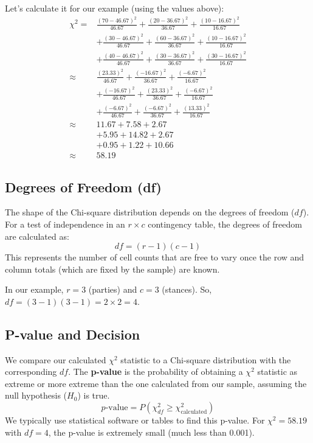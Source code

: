\documentclass{article}
\begin{document}
Let's calculate it for our example (using the values above):
\begin{align*} \chi^2 = & \frac{(70 - 46.67)^2}{46.67} + \frac{(20 - 36.67)^2}{36.67} + \frac{(10 - 16.67)^2}{16.67} \\ & + \frac{(30 - 46.67)^2}{46.67} + \frac{(60 - 36.67)^2}{36.67} + \frac{(10 - 16.67)^2}{16.67} \\ & + \frac{(40 - 46.67)^2}{46.67} + \frac{(30 - 36.67)^2}{36.67} + \frac{(30 - 16.67)^2}{16.67} \\ \approx & \frac{(23.33)^2}{46.67} + \frac{(-16.67)^2}{36.67} + \frac{(-6.67)^2}{16.67} \\ & + \frac{(-16.67)^2}{46.67} + \frac{(23.33)^2}{36.67} + \frac{(-6.67)^2}{16.67} \\ & + \frac{(-6.67)^2}{46.67} + \frac{(-6.67)^2}{36.67} + \frac{(13.33)^2}{16.67} \\ \approx & 11.67 + 7.58 + 2.67 \\ & + 5.95 + 14.82 + 2.67 \\ & + 0.95 + 1.22 + 10.66 \\ \approx & 58.19 \end{align*}

\subsection{Degrees of Freedom (df)}
The shape of the Chi-square distribution depends on the degrees of freedom ($df$). For a test of independence in an $r \times c$ contingency table, the degrees of freedom are calculated as:
$$ df = (r-1)(c-1) $$
This represents the number of cell counts that are free to vary once the row and column totals (which are fixed by the sample) are known.

In our example, $r=3$ (parties) and $c=3$ (stances). So, $df = (3-1)(3-1) = 2 \times 2 = 4$.

\subsection{P-value and Decision}
We compare our calculated $\chi^2$ statistic to a Chi-square distribution with the corresponding $df$. The \textbf{p-value} is the probability of obtaining a $\chi^2$ statistic as extreme or more extreme than the one calculated from our sample, assuming the null hypothesis ($H_0$) is true.
$$ p\text{-value} = P(\chi^2_{df} \ge \chi^2_{\text{calculated}}) $$
We typically use statistical software or tables to find this p-value. For $\chi^2 = 58.19$ with $df=4$, the p-value is extremely small (much less than 0.001).
\end{document}
